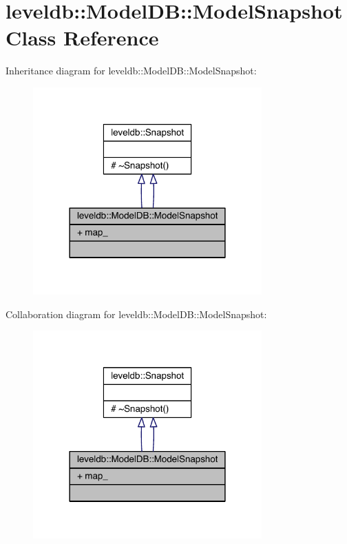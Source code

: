 \hypertarget{classleveldb_1_1_model_d_b_1_1_model_snapshot}{}\section{leveldb\+:\+:Model\+D\+B\+:\+:Model\+Snapshot Class Reference}
\label{classleveldb_1_1_model_d_b_1_1_model_snapshot}


Inheritance diagram for leveldb\+:\+:Model\+D\+B\+:\+:Model\+Snapshot\+:\nopagebreak
\begin{figure}[H]
\begin{center}
\leavevmode
\includegraphics[width=249pt]{classleveldb_1_1_model_d_b_1_1_model_snapshot__inherit__graph}
\end{center}
\end{figure}


Collaboration diagram for leveldb\+:\+:Model\+D\+B\+:\+:Model\+Snapshot\+:\nopagebreak
\begin{figure}[H]
\begin{center}
\leavevmode
\includegraphics[width=249pt]{classleveldb_1_1_model_d_b_1_1_model_snapshot__coll__graph}
\end{center}
\end{figure}

